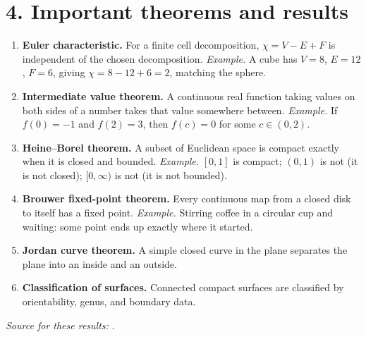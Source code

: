 \section*{4. Important theorems and results}
\begin{enumerate}[leftmargin=*,itemsep=0.35em]
\item \textbf{Euler characteristic.} For a finite cell decomposition, $\chi=V-E+F$ is independent of the chosen decomposition. \emph{Example.} A cube has $V=8$, $E=12$, $F=6$, giving $\chi=8-12+6=2$, matching the sphere.

\item \textbf{Intermediate value theorem.} A continuous real function taking values on both sides of a number takes that value somewhere between. \emph{Example.} If $f(0)=-1$ and $f(2)=3$, then $f(c)=0$ for some $c\in(0,2)$.

\item \textbf{Heine--Borel theorem.} A subset of Euclidean space is compact exactly when it is closed and bounded. \emph{Example.} $[0,1]$ is compact; $(0,1)$ is not (it is not closed); $[0,\infty)$ is not (it is not bounded).

\item \textbf{Brouwer fixed-point theorem.} Every continuous map from a closed disk to itself has a fixed point. \emph{Example.} Stirring coffee in a circular cup and waiting: some point ends up exactly where it started.

\item \textbf{Jordan curve theorem.} A simple closed curve in the plane separates the plane into an inside and an outside.

\item \textbf{Classification of surfaces.} Connected compact surfaces are classified by orientability, genus, and boundary data.
\end{enumerate}
\noindent\emph{Source for these results:} \cite{topology_ref1}.

\theoryapplications
{}
